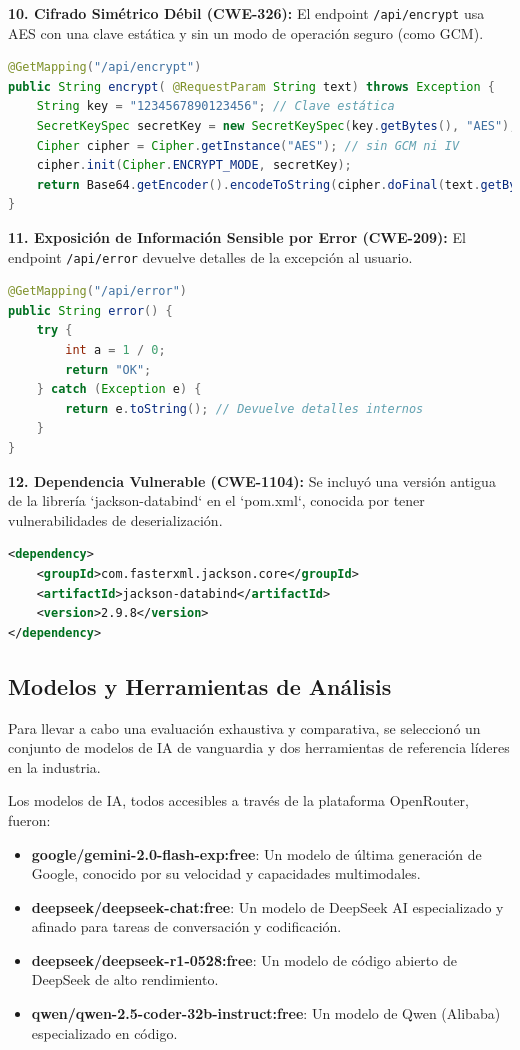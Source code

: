 \textbf{10. Cifrado Simétrico Débil (CWE-326):} El endpoint \texttt{/api/encrypt} usa AES con una clave estática y sin un modo de operación seguro (como GCM).
\begin{lstlisting}[language=java, caption={Cifrado simétrico débil (AES con clave fija).}]
@GetMapping("/api/encrypt")
public String encrypt( @RequestParam String text) throws Exception {
    String key = "1234567890123456"; // Clave estática
    SecretKeySpec secretKey = new SecretKeySpec(key.getBytes(), "AES");
    Cipher cipher = Cipher.getInstance("AES"); // sin GCM ni IV
    cipher.init(Cipher.ENCRYPT_MODE, secretKey);
    return Base64.getEncoder().encodeToString(cipher.doFinal(text.getBytes()));
}
\end{lstlisting}

\textbf{11. Exposición de Información Sensible por Error (CWE-209):} El endpoint \texttt{/api/error} devuelve detalles de la excepción al usuario.
\begin{lstlisting}[language=java, caption={Manejo de excepciones que expone información.}]
@GetMapping("/api/error")
public String error() {
    try {
        int a = 1 / 0;
        return "OK";
    } catch (Exception e) {
        return e.toString(); // Devuelve detalles internos
    }
}
\end{lstlisting}

\textbf{12. Dependencia Vulnerable (CWE-1104):} Se incluyó una versión antigua de la librería `jackson-databind` en el `pom.xml`, conocida por tener vulnerabilidades de deserialización.
\begin{lstlisting}[language=xml, caption={Dependencia vulnerable en pom.xml.}]
<dependency>
    <groupId>com.fasterxml.jackson.core</groupId>
    <artifactId>jackson-databind</artifactId>
    <version>2.9.8</version> 
</dependency>
\end{lstlisting}

\subsection{Modelos y Herramientas de Análisis}

Para llevar a cabo una evaluación exhaustiva y comparativa, se seleccionó un conjunto de modelos de IA de vanguardia y dos herramientas de referencia líderes en la industria.

Los modelos de IA, todos accesibles a través de la plataforma OpenRouter, fueron:
\begin{itemize}
    \item \textbf{google/gemini-2.0-flash-exp:free}: Un modelo de última generación de Google, conocido por su velocidad y capacidades multimodales.
    \item \textbf{deepseek/deepseek-chat:free}: Un modelo de DeepSeek AI especializado y afinado para tareas de conversación y codificación.
    \item \textbf{deepseek/deepseek-r1-0528:free}: Un modelo de código abierto de DeepSeek de alto rendimiento.
    \item \textbf{qwen/qwen-2.5-coder-32b-instruct:free}: Un modelo de Qwen (Alibaba) especializado en código.
\end{itemize}

